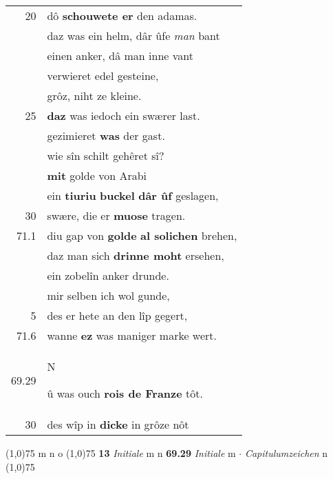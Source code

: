 \documentclass[8pt,a4paper,notitlepage]{article}
\begin{document}
\begin{table}[ht]
\begin{minipage}[t]{0.5\linewidth}
\begin{tabular}{rl}
20 & dô \textbf{schouwete er} den adamas.\\ 
 & daz was ein helm, dâr ûfe \textit{man} bant\\ 
 & einen anker, dâ man inne vant\\ 
 & verwieret edel gesteine,\\ 
 & grôz, niht ze kleine.\\ 
25 & \textbf{daz} was iedoch ein swærer last.\\ 
 & gezimieret \textbf{was} der gast.\\ 
 & wie sîn schilt gehêret sî?\\ 
 & \textbf{mit} golde von Arabi\\ 
 & ein \textbf{tiuriu} \textbf{buckel} \textbf{dâr ûf} geslagen,\\ 
30 & swære, die er \textbf{muose} tragen.\\ 
71.1 & diu gap von \textbf{golde} \textbf{al solichen} brehen,\\ 
 & daz man sich \textbf{drinne moht} ersehen,\\ 
 & ein zobelîn anker drunde.\\ 
 & mir selben ich wol gunde,\\ 
5 & des er hete an den lîp gegert,\\ 
71.6 & wanne \textbf{ez} was maniger marke wert.\\ 
69.29 & \begin{large}N\end{large}û was ouch \textbf{rois de Franze} tôt.\\ 
30 & des wîp in \textbf{dicke} in grôze nôt\\ 
\end{tabular}
\scriptsize
\line(1,0){75} \newline
m n o \newline
\line(1,0){75} \newline
\textbf{13} \textit{Initiale} m n  \textbf{69.29} \textit{Initiale} m   $\cdot$ \textit{Capitulumzeichen} n  \newline
\line(1,0){75} \newline

\end{minipage}
\end{table}
\end{document}
